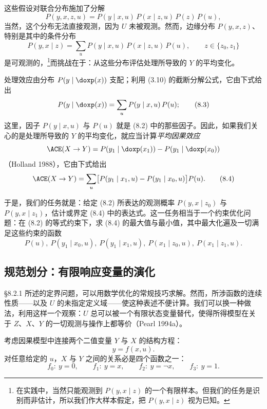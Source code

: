 这些假设对联合分布施加了分解
\begin{equation}
P(y,x,z,u)=P(y\mid x,u)\,P(x\mid z,u)\,P(z)\,P(u), \tag{8.1}
\end{equation}
当然，这个分布无法直接观测，因为 $U$ 未被观测。然而，边缘分布 $P(y,x,z)$、特别是其中的条件分布
\begin{equation}
P(y,x\mid z)=\sum_{u}P(y\mid x,u)\,P(x\mid z,u)\,P(u),\qquad z\in\{z_0,z_1\} \tag{8.2}
\end{equation}
是可观测的，\footnote{在实践中，当然只能观测到 $P(y,x\mid z)$ 的一个有限样本。但我们的任务是识别而非估计，所以我们作大样本假定，把 $P(y,x\mid z)$ 视为已知。}而挑战在于：从这些分布评估处理所导致的 $Y$ 的平均变化。

处理效应由分布 $P(y\mid\doxp(x))$ 支配；利用 \textup{(3.10)} 的截断分解公式，它由下式给出
\begin{equation}
P(y\mid\doxp(x))=\sum_{u}P(y\mid x,u)\,P(u); \tag{8.3}
\end{equation}
这里，因子 $P(y\mid x,u)$ 与 $P(u)$ 就是 \textup{(8.2)} 中的那些因子。因此，如果我们关心的是处理所导致的 $Y$ 的平均变化，就应当计算\emph{平均因果效应}
\[
\ACE(X\to Y)=P(y_1\mid\doxp(x_1))-P(y_1\mid\doxp(x_0))
\]
（Holland 1988），它由下式给出
\begin{equation}
\ACE(X\to Y)=\sum_{u}\bigl[P(y_1\mid x_1,u)-P(y_1\mid x_0,u)\bigr]P(u). \tag{8.4}
\end{equation}

于是，我们的任务就是：给定 \textup{(8.2)} 所表达的观测概率 $P(y,x\mid z_0)$ 与 $P(y,x\mid z_1)$，估计或界定 \textup{(8.4)} 中的表达式。这一任务相当于一个约束优化问题：在 \textup{(8.2)} 的等式约束下，求 \textup{(8.4)} 的最大值与最小值，其中最大化遍及一切满足这些约束的函数
\[
P(u),\ P(y_1\mid x_0,u),\ P(y_1\mid x_1,u),\ P(x_1\mid z_0,u),\ P(x_1\mid z_1,u).
\]

\subsection{规范划分：有限响应变量的演化}

\S 8.2.1 所述的定界问题，可以用数学优化的常规技巧求解。然而，所涉函数的连续性质——以及 $U$ 的未指定定义域——使这种表述不便计算。我们可以换一种做法，利用这样一个观察：$U$ 总可以被一个有限状态变量替代，使得所得模型在关于 $Z$、$X$、$Y$ 的一切观测与操作上都等价（Pearl 1994a）。

考虑因果模型中连接两个二值变量 $Y$ 与 $X$ 的结构方程：
\[
y=f(x,u).
\]
对任意给定的 $u$，$X$ 与 $Y$ 之间的关系必是四个函数之一：
\begin{equation}
f_0:\ y=0,\qquad f_1:\ y=x,\qquad f_2:\ y=\neg x,\qquad f_3:\ y=1. \tag{8.5}
\end{equation}

